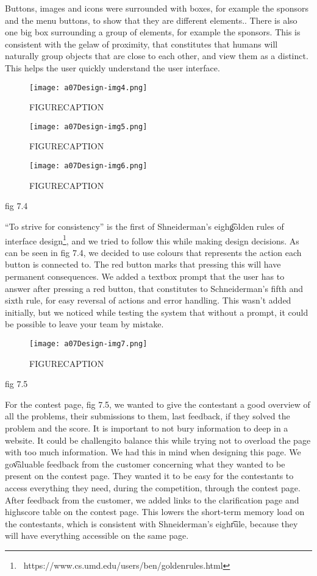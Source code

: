Buttons, images and icons were surrounded with boxes, for example the
sponsors and the menu buttons, to show that they are different
elements.. There is also one big box surrounding a group of elements,
for example the sponsors. This is consistent with the ge\stalt law of
proximity, that constitutes that humans will naturally group objects
that are close to each other, and view them as a distinct.
This helps the user quickly understand the user interface.


 \begin{figure}[h!]
	\texttt{[image: a07Design-img4.png]} 
	\caption{FIGURECAPTION}
\end{figure}
\begin{figure}[h!]
	\texttt{[image: a07Design-img5.png]} 
	\caption{FIGURECAPTION}
\end{figure}
\begin{figure}[h!]
	\texttt{[image: a07Design-img6.png]} 
	\caption{FIGURECAPTION}
\end{figure}
fig 7.4

``To strive for consistency'' is the
first of Shneiderman's eigh\t golden rules of interface
design\footnote{\ https://www.cs.umd.edu/users/ben/goldenrules.html},
and we tried to follow this while making design decisions. As can be
seen in fig 7.4, we decided to use colours that represents the action
each button is connected to. The red button marks that pressing this
will have permanent consequences. We added a textbox prompt that the
user has to answer after pressing a red button, that constitutes to
Schneiderman's fifth and sixth rule, for easy reversal
of actions and error handling. This wasn't added
initially, but we noticed while testing the system that without a
prompt, it could be possible to leave your team by mistake.
 \begin{figure}[h!]
	\texttt{[image: a07Design-img7.png]} 
	\caption{FIGURECAPTION}
\end{figure}
fig 7.5

For the contest page, fig 7.5, we wanted to give the contestant a good
overview of all the problems, their submissions to them, last feedback,
if they solved the problem and the score. It is important to not bury
information to deep in a website. It could be challengi\ng to balance
this while trying not to overload the page with too much information.
We had this in mind when designing this page. We go\t valuable feedback
from the customer concerning what they wanted to be present on the
contest page. They wanted it to be easy for the contestants to access
everything they need, during the competition, through the contest page.
After feedback from the customer, we added links to the clarification
page and highscore table on the contest page. This lowers the
short-term memory load on the contestants, which is consistent with
Shneiderman's eigh\t rule, because they will have
everything accessible on the same page.


